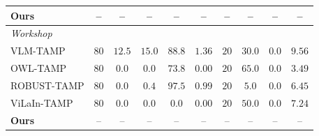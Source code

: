 \begin{table}[t]
\begin{tabular}{lccccccccc}
\textbf{Ours} & -- & -- & -- & -- & -- & -- & -- & -- & -- \\
\midrule
\textit{Workshop} & & & & & & & & & \\
VLM-TAMP & $80$ & $\mathbf{12.5}$ & $\mathbf{15.0}$ & $88.8$ & $\mathbf{1.36}$ & $20$ & $30.0$ & $0.0$ & $9.56$ \\
OWL-TAMP & $80$ & $0.0$ & $0.0$ & $73.8$ & $0.00$ & $20$ & $\mathbf{65.0}$ & $0.0$ & $\mathbf{3.49}$ \\
ROBUST-TAMP & $80$ & $0.0$ & $0.4$ & $\mathbf{97.5}$ & $0.99$ & $20$ & $5.0$ & $0.0$ & $6.45$ \\
ViLaIn-TAMP & $80$ & $0.0$ & $0.0$ & $0.0$ & $0.00$ & $20$ & $50.0$ & $0.0$ & $7.24$ \\
\textbf{Ours} & -- & -- & -- & -- & -- & -- & -- & -- & -- \\
\bottomrule
\end{tabular}
\end{table}
